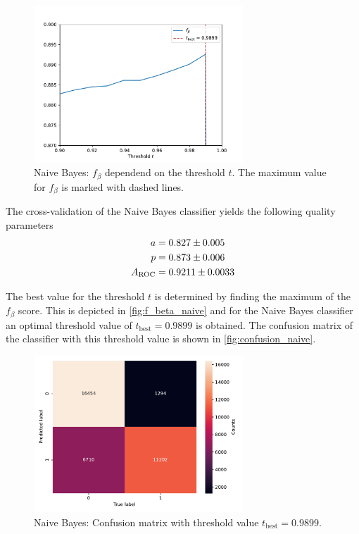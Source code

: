 \begin{figure}
    \centering
    \includegraphics[width=0.7\textwidth]{content/plots/f_beta_naive.pdf}
    \caption{Naive Bayes: $f_{\beta}$ dependend on the threshold $t$. The maximum value for $f_{\beta}$ is marked with dashed lines.}
    \label{fig:f_beta_naive}
\end{figure}
The cross-validation of the Naive Bayes classifier yields the following quality parameters
\begin{align*}
    a &= \num{0.827 \pm 0.005} \\
    p &= \num{0.873 \pm 0.006} \\
    A_{\mathrm{ROC}} &= \num{0.9211 \pm 0.0033}
\end{align*}

The best value for the threshold $t$ is determined by finding the maximum of the $f_{\beta}$ score. This is depicted in \autoref{fig:f_beta_naive} and for the
Naive Bayes classifier an optimal threshold value of $t_{\mathrm{best}} = \num{0.9899}$ is obtained.
The confusion matrix of the classifier with this threshold value is shown in \autoref{fig:confusion_naive}.
\begin{figure}
    \centering
    \includegraphics[width=0.7\textwidth]{content/plots/confusion_naive.pdf}
    \caption{Naive Bayes: Confusion matrix with threshold value $t_{\mathrm{best}} = \num{0.9899}$.}
    \label{fig:confusion_naive}
\end{figure}

